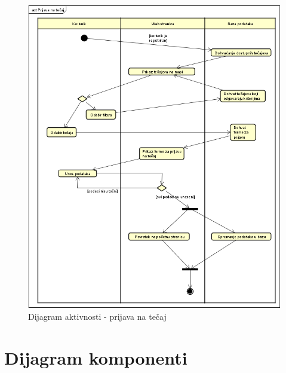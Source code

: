             \begin{figure}[H]
			\includegraphics[scale=0.4]{slike/DijagramAktivnosti.PNG} %
			\centering
			\caption{Dijagram aktivnosti - prijava na tečaj}
			\label{fig:stanje}
		\end{figure}
		
		\section{Dijagram komponenti}
		
		
